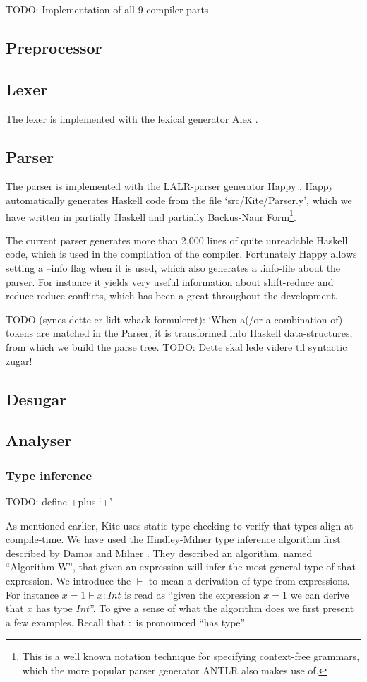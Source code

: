 TODO: Implementation of all 9 compiler-parts

\subsection{Preprocessor}
\subsection{Lexer}
The lexer is implemented with the lexical generator Alex \cite{dornan01}.

\subsection{Parser}
The parser is implemented with the LALR-parser generator Happy \cite{marlow01}. Happy automatically generates Haskell code from the file `src/Kite/Parser.y', which we have written in partially Haskell and partially Backus-Naur Form\footnote{This is a well known notation technique for specifying context-free grammars, which the more popular parser generator ANTLR also makes use of.}.

The current parser generates more than 2,000 lines of quite unreadable Haskell code, which is used in the compilation of the compiler. Fortunately Happy allows setting a --info flag when it is used, which also generates a .info-file about the parser. For instance it yields very useful information about shift-reduce and reduce-reduce conflicts, which has been a great throughout the development.

TODO (synes dette er lidt whack formuleret): `When a(/or a combination of) tokens are matched in the Parser, it is transformed into Haskell data-structures, from which we build the parse tree. TODO: Dette skal lede videre til syntactic zugar!


\subsection{Desugar}
\subsection{Analyser}

\subsubsection{Type inference}

TODO: define +plus `+'

As mentioned earlier, Kite uses static type checking to verify that types align at compile-time. We have used the Hindley-Milner type inference algorithm first described by Damas and Milner \cite{milner82}. They described an algorithm, named ``Algorithm W'', that given an expression will infer the most general type of that expression. We introduce the $\vdash$ to mean a derivation of type from expressions. For instance $x = 1 \vdash x : Int$ is read as ``given the expression $x = 1$ we can derive that $x$ has type $Int$''. To give a sense of what the algorithm does we first present a few examples. Recall that $:$ is pronounced ``has type''

